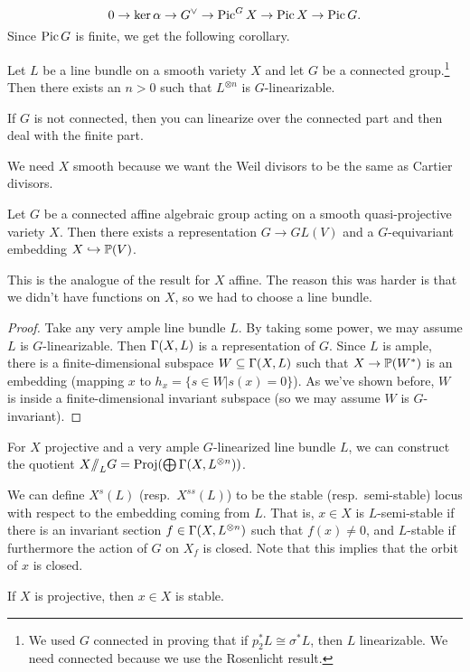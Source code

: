 \[
 0\to \ker\alpha\to G^\vee\to \operatorname{Pic}^G X\to \operatorname{Pic} X\to \operatorname{Pic} G.
\]
Since $\operatorname{Pic} G$ is finite, we get the following corollary.
\begin{corollary}
 Let $L$ be a line bundle on a smooth variety $X$ and let $G$ be a connected group.\footnote{We used $G$ connected in proving that if $p_2^*L\cong \sigma^*L$, then $L$ linearizable. We need connected because we use the Rosenlicht result.} Then there exists an $n>0$ such that $L^{\otimes n}$ is $G$-linearizable.
\end{corollary}
\begin{remark}
 If $G$ is not connected, then you can linearize over the connected part and then deal with the finite part.
\end{remark}
\begin{remark}
 We need $X$ smooth because we want the Weil divisors to be the same as Cartier divisors.
\end{remark}
\begin{theorem}
 Let $G$ be a connected affine algebraic group acting on a smooth quasi-projective variety $X$. Then there exists a representation $G\to GL(V)$ and a $G$-equivariant embedding $X\hookrightarrow \mathbb{P}(V)$.
\end{theorem}
This is the analogue of the result for $X$ affine. The reason this was harder is that we didn't have functions on $X$, so we had to choose a line bundle.
\begin{proof}
 Take any very ample line bundle $L$. By taking some power, we may assume $L$ is $G$-linearizable. Then $\Gamma(X,L)$ is a representation of $G$. Since $L$ is ample, there is a finite-dimensional subspace $W\subseteq \Gamma(X,L)$ such that $X\to \mathbb{P}(W^*)$ is an embedding (mapping $x$ to $h_x=\{s\in W|s(x)=0\}$). As we've shown before, $W$ is inside a finite-dimensional invariant subspace (so we may assume $W$ is $G$-invariant).
\end{proof}
For $X$ projective and a very ample $G$-linearized line bundle $L$, we can construct the quotient $X\mbox{\rm /\!\!/}_L G = \operatorname{Proj}(\bigoplus \Gamma(X,L^{\otimes n}))$.

We can define $X^s(L)$ (resp.~$X^{ss}(L)$) to be the stable (resp.~semi-stable) locus with respect to the embedding coming from $L$. That is, $x\in X$ is $L$-semi-stable if there is an invariant section $f\in \Gamma(X,L^{\otimes n})$ such that $f(x)\neq 0$, and $L$-stable if furthermore the action of $G$ on $X_f$ is closed. Note that this implies that the orbit of $x$ is closed.

If $X$ is projective, then $x\in X$ is stable.







